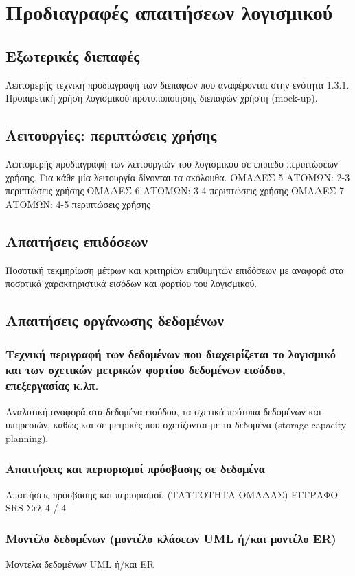\section{Προδιαγραφές απαιτήσεων λογισμικού}

\subsection{Εξωτερικές διεπαφές}
Λεπτομερής τεχνική προδιαγραφή των διεπαφών που αναφέρονται στην ενότητα 1.3.1.
Προαιρετική χρήση λογισμικού προτυποποίησης διεπαφών χρήστη (mock-up).

\subsection{Λειτουργίες: περιπτώσεις χρήσης}
Λεπτομερής προδιαγραφή των λειτουργιών του λογισμικού σε επίπεδο περιπτώσεων χρήσης.
Για κάθε μία λειτουργία δίνονται τα ακόλουθα.
ΟΜΑΔΕΣ 5 ΑΤΟΜΩΝ: 2-3 περιπτώσεις χρήσης
ΟΜΑΔΕΣ 6 ΑΤΟΜΩΝ: 3-4 περιπτώσεις χρήσης
ΟΜΑΔΕΣ 7 ΑΤΟΜΩΝ: 4-5 περιπτώσεις χρήσης





\subsection{Απαιτήσεις επιδόσεων}
Ποσοτική τεκμηρίωση μέτρων και κριτηρίων επιθυμητών επιδόσεων με αναφορά στα ποσοτικά
χαρακτηριστικά εισόδων και φορτίου του λογισμικού.
\subsection{Απαιτήσεις οργάνωσης δεδομένων}
\subsubsection{Τεχνική περιγραφή των δεδομένων που διαχειρίζεται το λογισμικό και των σχετικών
μετρικών φορτίου δεδομένων εισόδου, επεξεργασίας κ.λπ.}
Αναλυτική αναφορά στα δεδομένα εισόδου, τα σχετικά πρότυπα δεδομένων και υπηρεσιών, καθώς και σε
μετρικές που σχετίζονται με τα δεδομένα (storage capacity planning).
\subsubsection{Απαιτήσεις και περιορισμοί πρόσβασης σε δεδομένα}
Απαιτήσεις πρόσβασης και περιορισμοί.
(ΤΑΥΤΟΤΗΤΑ ΟΜΑΔΑΣ) ΕΓΓΡΑΦΟ SRS Σελ 4 / 4
\subsubsection{Μοντέλο δεδομένων (μοντέλο κλάσεων UML ή/και μοντέλο ER)}
Μοντέλα δεδομένων UML ή/και ER
